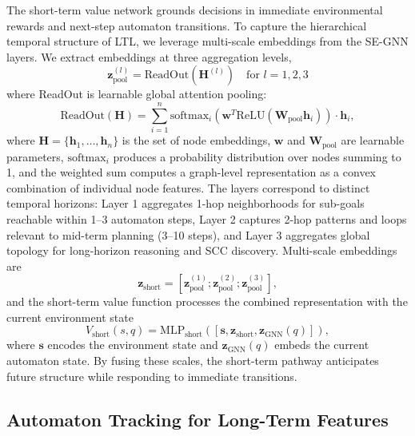 \documentclass{article}
\begin{document}
The short-term value network grounds decisions in immediate environmental rewards and next-step automaton transitions. To capture the hierarchical temporal structure of LTL, we leverage multi-scale embeddings from the SE-GNN layers.
We extract embeddings at three aggregation levels,
\begin{equation}
\mathbf{z}^{(l)}_{\text{pool}} = \text{ReadOut}(\mathbf{H}^{(l)}) \quad \text{for } l = 1, 2, 3
\label{eq:multiscale_readout}
\end{equation}
where ReadOut is learnable global attention pooling:
\begin{equation}
\label{eq:readout}
\text{ReadOut}(\mathbf{H}) = \sum_{i=1}^{n} \text{softmax}_i(\mathbf{w}^T \text{ReLU}(\mathbf{W}_{\text{pool}} \mathbf{h}_i)) \cdot \mathbf{h}_i,
\end{equation}
where $\mathbf{H} = \{\mathbf{h}_1, \ldots, \mathbf{h}_n\}$ is the set of node embeddings, $\mathbf{w}$ and $\mathbf{W}_{\text{pool}}$ are learnable parameters, $\text{softmax}_i$ produces a probability distribution over nodes summing to 1, and the weighted sum computes a graph-level representation as a convex combination of individual node features. The layers correspond to distinct temporal horizons: Layer 1 aggregates 1-hop neighborhoods for sub-goals reachable within 1–3 automaton steps, Layer 2 captures 2-hop patterns and loops relevant to mid-term planning (3–10 steps), and Layer 3 aggregates global topology for long-horizon reasoning and SCC discovery. Multi-scale embeddings are 
\begin{equation}
\mathbf{z}_{\text{short}} = [\mathbf{z}_{\text{pool}}^{(1)}; \mathbf{z}_{\text{pool}}^{(2)}; \mathbf{z}_{\text{pool}}^{(3)}],
\end{equation}
and the short-term value function processes the combined representation with the current environment state
\begin{equation}
V_{\text{short}}(s, q) = \text{MLP}_{\text{short}}([\mathbf{s}, \mathbf{z}_{\text{short}}, \mathbf{z}_{\text{GNN}}(q)]),
\label{eq:short_value_comp}
\end{equation}
where $\mathbf{s}$ encodes the environment state and $\mathbf{z}_{\text{GNN}}(q)$ embeds the current automaton state. By fusing these scales, the short-term pathway anticipates future structure while responding to immediate transitions.

\subsection{Automaton Tracking for Long-Term Features}
\end{document}
